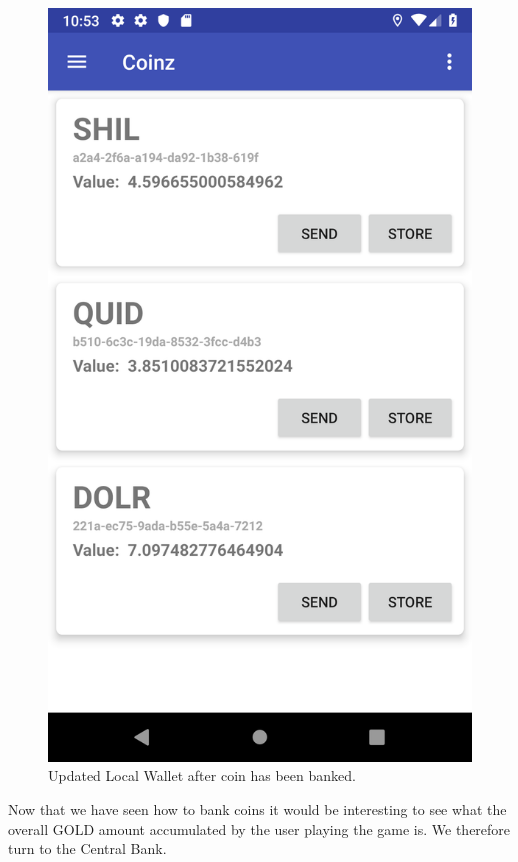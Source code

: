 \documentclass[11pt,a4paper,notitlepage]{article}
\begin{document}
\begin{figure}[H]
    \centering
    \includegraphics[scale=0.25]{screenshots/local-wallet/local-wallet-after-coin-store.png}
    \caption{Updated Local Wallet after coin has been banked.}
\end{figure}

    Now that we have seen how to bank coins it would be interesting to see what the overall GOLD amount accumulated by the user playing the game is. We therefore turn to the Central Bank.
\end{document}
